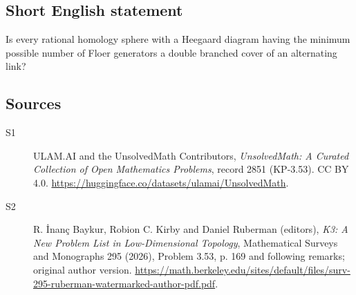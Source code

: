 \documentclass[11pt]{article}
\begin{document}
\subsection{Short English statement}
Is every rational homology sphere with a Heegaard diagram having the minimum possible number of Floer generators a double branched cover of an alternating link?
\subsection{Sources}
\begin{description}
\item[\hypertarget{source:2851:1}{S1}] ULAM.AI and the UnsolvedMath Contributors, \emph{UnsolvedMath: A Curated Collection of Open Mathematics Problems}, record 2851 (KP-3.53). CC BY 4.0. \url{https://huggingface.co/datasets/ulamai/UnsolvedMath}.
\item[\hypertarget{source:2851:2}{S2}] R. İnanç Baykur, Robion C. Kirby and Daniel Ruberman (editors), \emph{K3: A New Problem List in Low-Dimensional Topology}, Mathematical Surveys and Monographs 295 (2026), Problem 3.53, p. 169 and following remarks; original author version. \url{https://math.berkeley.edu/sites/default/files/surv-295-ruberman-watermarked-author-pdf.pdf}.
\end{description}
\label{end:2851}
\end{document}
